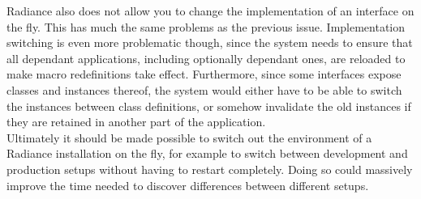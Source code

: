 \documentclass{sig-alternate}
\begin{document}
Radiance also does not allow you to change the implementation of an interface on the fly. This has much the same problems as the previous issue. Implementation switching is even more problematic though, since the system needs to ensure that all dependant applications, including optionally dependant ones, are reloaded to make macro redefinitions take effect. Furthermore, since some interfaces expose classes and instances thereof, the system would either have to be able to switch the instances between class definitions, or somehow invalidate the old instances if they are retained in another part of the application. \\

Ultimately it should be made possible to switch out the environment of a Radiance installation on the fly, for example to switch between development and production setups without having to restart completely. Doing so could massively improve the time needed to discover differences between different setups.


\end{document}
